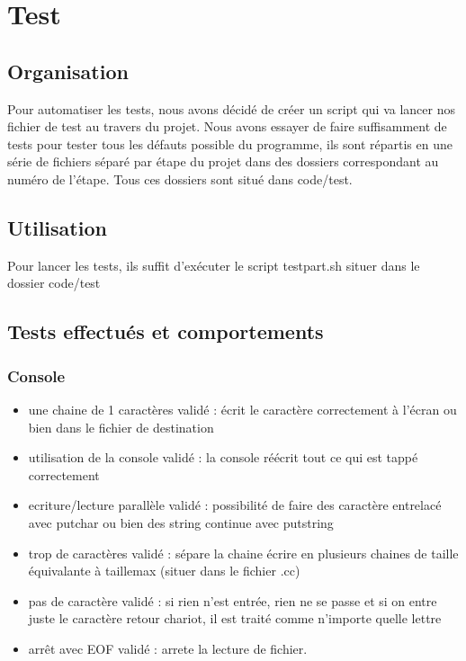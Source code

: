 \documentclass{article}
\begin{document}
\section{Test}
	\subsection{Organisation}
		{Pour automatiser les tests, nous avons décidé de créer un script qui va lancer nos fichier de test au travers du projet.
		Nous avons essayer de faire suffisamment de tests pour tester tous les défauts possible du programme, ils sont répartis en une série de fichiers séparé par étape du projet dans des dossiers correspondant au numéro de l'étape. Tous ces dossiers sont situé dans code/test.}

	\subsection{Utilisation}
		{Pour lancer les tests, ils suffit d'exécuter le script testpart.sh situer dans le dossier code/test}

	\subsection{Tests effectués et comportements}
		\subsubsection{Console}
			\begin{itemize}
				\item une chaine de 1 caractères 			validé : écrit le caractère	correctement à l'écran ou bien dans le fichier de destination
				\item utilisation de la console				validé : la console réécrit tout ce qui est tappé correctement
				\item ecriture/lecture parallèle			validé : possibilité de faire des caractère entrelacé avec putchar ou bien des string continue avec putstring
				\item trop de caractères					validé : sépare la chaine écrire en plusieurs chaines de taille équivalante à taillemax (situer dans le fichier .cc)
				\item pas de caractère 						validé : si rien n'est entrée, rien ne se passe et si on entre juste le caractère retour chariot, il est traité comme n'importe quelle lettre
				\item arrêt avec EOF 						validé : arrete la lecture de fichier.
			\end{itemize}
\end{document}
